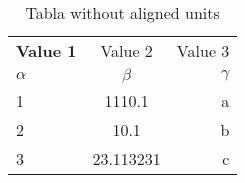 \documentclass{article}
\begin{document}
	
	\begin{table}[h!]
		\caption{Tabla without aligned units}
		\label{tab:table1}
		\begin{tabular}{l|c|r}
			\textbf{Value 1} & {Value 2} & {Value 3}\\
			$\alpha$ & $\beta$ & $\gamma$\\
			\hline
			1 & 1110.1 & a\\
			2 & 10.1 & b\\
			3 & 23.113231 & c\\
			\end{tabular}
		\end{table}
	
\end{document}
